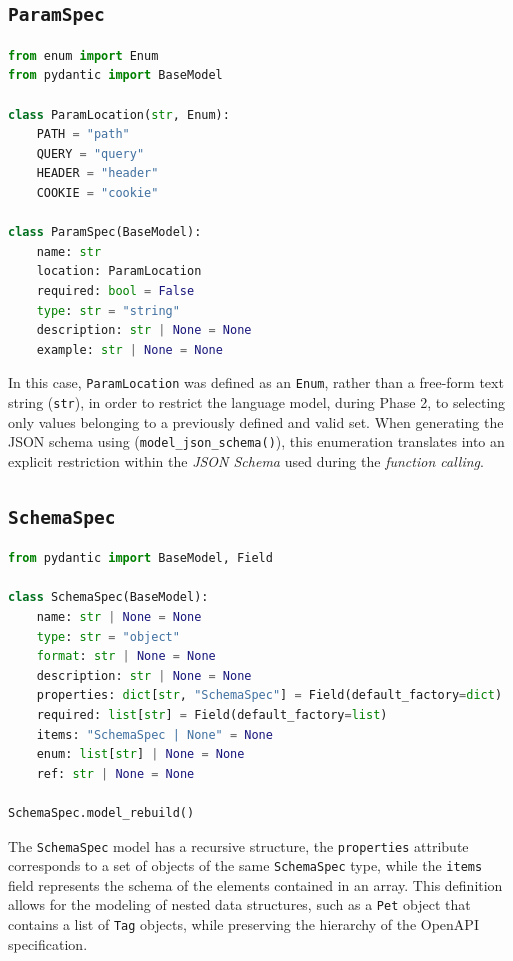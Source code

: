\subsection{\texttt{ParamSpec}}

\begin{lstlisting}[language=Python, caption={\texttt{src/spekforge/models/param.py}}]
from enum import Enum
from pydantic import BaseModel

class ParamLocation(str, Enum):
    PATH = "path"
    QUERY = "query"
    HEADER = "header"
    COOKIE = "cookie"

class ParamSpec(BaseModel):
    name: str
    location: ParamLocation
    required: bool = False
    type: str = "string"
    description: str | None = None
    example: str | None = None
\end{lstlisting}
In this case, \texttt{ParamLocation} was defined as an \texttt{Enum}, 
rather than a free-form text string (\texttt{str}), in order to restrict 
the language model, during Phase 2, to selecting only values belonging to 
a previously defined and valid set. When generating the JSON schema 
using (\texttt{model\_json\_schema()}), this enumeration translates 
into an explicit restriction within the \textit{JSON Schema} used 
during the \textit{function calling}.

\subsection{\texttt{SchemaSpec}}

\begin{lstlisting}[language=Python, caption={\texttt{src/spekforge/models/schema.py}}]
from pydantic import BaseModel, Field

class SchemaSpec(BaseModel):
    name: str | None = None
    type: str = "object"
    format: str | None = None
    description: str | None = None
    properties: dict[str, "SchemaSpec"] = Field(default_factory=dict)
    required: list[str] = Field(default_factory=list)
    items: "SchemaSpec | None" = None
    enum: list[str] | None = None
    ref: str | None = None

SchemaSpec.model_rebuild()
\end{lstlisting}

The \texttt{SchemaSpec} model has a recursive structure, the \texttt{properties} attribute corresponds to a set of objects of the same \texttt{SchemaSpec} type, while the \texttt{items} field represents the schema of the elements contained in an array. This definition allows for the modeling of nested data structures, such as a \texttt{Pet} object that contains a list of \texttt{Tag} objects, while preserving the hierarchy of the OpenAPI specification.


